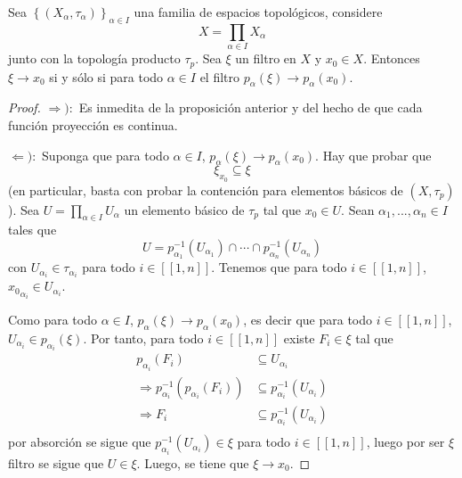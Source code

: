 \documentclass[12pt]{report}
\theoremstyle{largebreak}
\newcommand{\natint}[1]{\ensuremath{\left[\!\left[#1\right]\!\right]}}
\begin{document}
    \begin{propo}
        Sea $\left\{(X_\alpha,\tau_\alpha)\right\}_{ \alpha\in I}$ una familia de espacios topológicos, considere
        \begin{equation*}
            X=\prod_{\alpha\in I}X_\alpha
        \end{equation*}
        junto con la topología producto $\tau_p$. Sea $\xi$ un filtro en $X$ y $x_0\in X$. Entonces $\xi\rightarrow x_0$ si y sólo si para todo $\alpha\in I$ el filtro $p_\alpha(\xi)\rightarrow p_\alpha(x_0)$.
    \end{propo}

    \begin{proof}
        $\Rightarrow):$ Es inmedita de la proposición anterior y del hecho de que cada función proyección es continua.

        $\Leftarrow):$ Suponga que para todo $\alpha\in I$, $p_\alpha(\xi)\rightarrow p_\alpha(x_0)$. Hay que probar que
        \begin{equation*}
            \xi_{ x_0}\subseteq \xi
        \end{equation*}
        (en particular, basta con probar la contención para elementos básicos de $(X,\tau_p)$). Sea $U=\prod_{\alpha\in I}U_\alpha$ un elemento básico de $\tau_p$ tal que $x_0\in U$. Sean $\alpha_1,...,\alpha_n\in I$ tales que
        \begin{equation*}
            U=p_{\alpha_1}^{-1}(U_{\alpha_1})\cap\cdots\cap p_{\alpha_n}^{-1}(U_{\alpha_n}) 
        \end{equation*}
        con $U_{\alpha_i}\in\tau_{\alpha_i}$ para todo $i\in\natint{1,n}$. Tenemos que para todo $i\in\natint{1,n}$, ${x_0}_{\alpha_i}\in U_{\alpha_i}$.

        Como para todo $\alpha\in I$, $p_\alpha(\xi)\rightarrow p_\alpha(x_0)$, es decir que para todo $i\in\natint{1,n}$, $U_{\alpha_i}\in p_{\alpha_i}(\xi)$. Por tanto, para todo $i\in\natint{1,n}$ existe $F_i\in\xi$ tal que
        \begin{equation*}
            \begin{split}
                p_{\alpha_i}(F_i)&\subseteq U_{\alpha_i}\\
                \Rightarrow p_{\alpha_i}^{-1}(p_{\alpha_i}(F_i))&\subseteq p_{\alpha_i}^{-1}(U_{\alpha_i})\\
                \Rightarrow F_i&\subseteq p_{\alpha_i}^{-1}(U_{\alpha_i})\\
            \end{split}
        \end{equation*}
        por absorción se sigue que $p_{\alpha_i}^{-1}(U_{\alpha_i})\in\xi$ para todo $i\in\natint{1,n}$, luego por ser $\xi$ filtro se sigue que $U\in\xi$.
        Luego, se tiene que $\xi\rightarrow x_0$.
    \end{proof}
\end{document}
